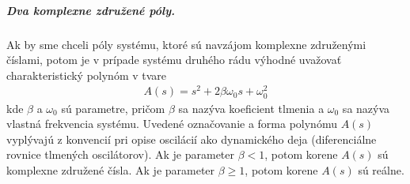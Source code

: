 \documentclass[a4paper, 10pt, ]{article}
\begin{document}
\subparagraph{Dva komplexne združené póly.}

Ak by sme chceli póly systému, ktoré sú navzájom komplexne združenými číslami, potom je v prípade systému druhého rádu výhodné uvažovať charakteristický polynóm v tvare
\begin{align}
    A(s) = s^2 + 2 \beta \omega_0 s + \omega_0^2
\end{align}
kde $\beta$ a $\omega_0$ sú parametre, pričom $\beta$ sa nazýva koeficient tlmenia a $\omega_0$ sa nazýva vlastná frekvencia systému. Uvedené označovanie a forma polynómu $A(s)$ vyplývajú z konvencií pri opise oscilácií ako dynamického deja (diferenciálne rovnice tlmených oscilátorov). Ak je parameter $\beta < 1$, potom korene $A(s)$ sú komplexne združené čísla. Ak je parameter $\beta \geq 1$, potom korene $A(s)$ sú reálne.
\end{document}
